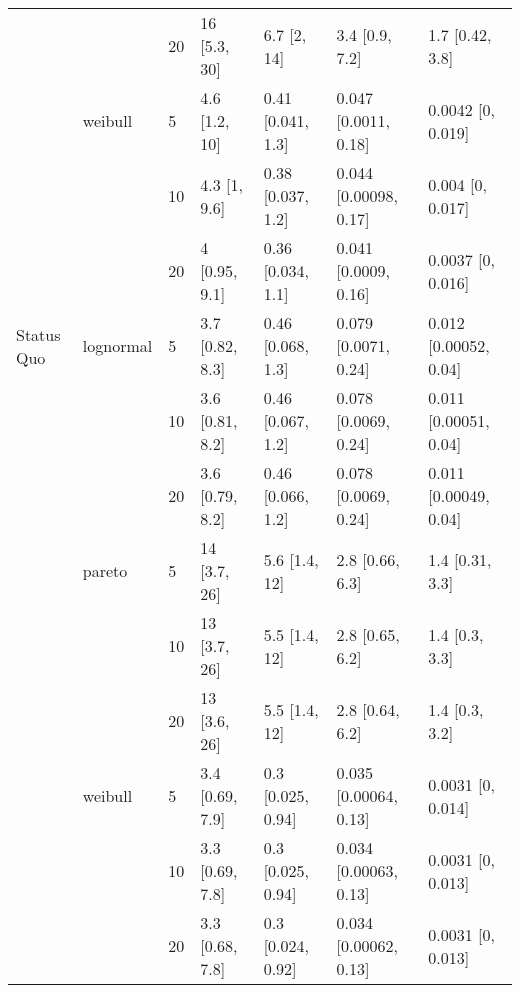 \begin{tabular}{lllllll}
           &         & 20 &      16 [5.3, 30] &         6.7 [2, 14] &         3.4 [0.9, 7.2] &          1.7 [0.42, 3.8] \\
           & weibull & 5  &     4.6 [1.2, 10] &   0.41 [0.041, 1.3] &   0.047 [0.0011, 0.18] &        0.0042 [0, 0.019] \\
           &         & 10 &      4.3 [1, 9.6] &   0.38 [0.037, 1.2] &  0.044 [0.00098, 0.17] &         0.004 [0, 0.017] \\
           &         & 20 &     4 [0.95, 9.1] &   0.36 [0.034, 1.1] &   0.041 [0.0009, 0.16] &        0.0037 [0, 0.016] \\
Status Quo & lognormal & 5  &   3.7 [0.82, 8.3] &   0.46 [0.068, 1.3] &   0.079 [0.0071, 0.24] &    0.012 [0.00052, 0.04] \\
           &         & 10 &   3.6 [0.81, 8.2] &   0.46 [0.067, 1.2] &   0.078 [0.0069, 0.24] &    0.011 [0.00051, 0.04] \\
           &         & 20 &   3.6 [0.79, 8.2] &   0.46 [0.066, 1.2] &   0.078 [0.0069, 0.24] &    0.011 [0.00049, 0.04] \\
           & pareto & 5  &      14 [3.7, 26] &       5.6 [1.4, 12] &        2.8 [0.66, 6.3] &          1.4 [0.31, 3.3] \\
           &         & 10 &      13 [3.7, 26] &       5.5 [1.4, 12] &        2.8 [0.65, 6.2] &           1.4 [0.3, 3.3] \\
           &         & 20 &      13 [3.6, 26] &       5.5 [1.4, 12] &        2.8 [0.64, 6.2] &           1.4 [0.3, 3.2] \\
           & weibull & 5  &   3.4 [0.69, 7.9] &   0.3 [0.025, 0.94] &  0.035 [0.00064, 0.13] &        0.0031 [0, 0.014] \\
           &         & 10 &   3.3 [0.69, 7.8] &   0.3 [0.025, 0.94] &  0.034 [0.00063, 0.13] &        0.0031 [0, 0.013] \\
           &         & 20 &   3.3 [0.68, 7.8] &   0.3 [0.024, 0.92] &  0.034 [0.00062, 0.13] &        0.0031 [0, 0.013] \\
\bottomrule
\end{tabular}
